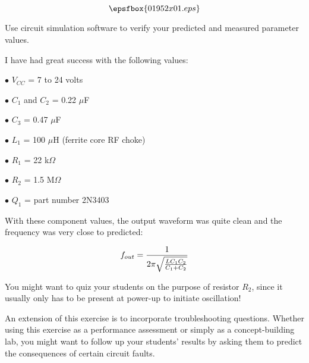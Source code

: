 

$$\epsfbox{01952x01.eps}$$

\vfil \eject






Use circuit simulation software to verify your predicted and measured parameter values.







I have had great success with the following values:

\medskip
\item{$\bullet$} $V_{CC}$ = 7 to 24 volts
\item{$\bullet$} $C_1$ and $C_2$ = 0.22 $\mu$F
\item{$\bullet$} $C_3$ = 0.47 $\mu$F
\item{$\bullet$} $L_1$ = 100 $\mu$H (ferrite core RF choke)
\item{$\bullet$} $R_1$ = 22 k$\Omega$
\item{$\bullet$} $R_2$ = 1.5 M$\Omega$
\item{$\bullet$} $Q_1$ = part number 2N3403
\medskip

With these component values, the output waveform was quite clean and the frequency was very close to predicted:

$$f_{out} = {1 \over {2 \pi \sqrt{L C_1 C_2 \over C_1 + C_2}}}$$

You might want to quiz your students on the purpose of resistor $R_2$, since it usually only has to be present at power-up to initiate oscillation!

An extension of this exercise is to incorporate troubleshooting questions.  Whether using this exercise as a performance assessment or simply as a concept-building lab, you might want to follow up your students' results by asking them to predict the consequences of certain circuit faults.




